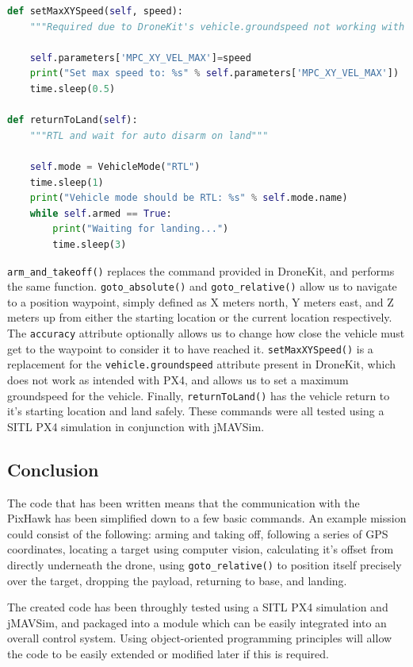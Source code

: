 \documentclass[11pt]{article}
\begin{document}
\begin{lstlisting}[language=Python]
def setMaxXYSpeed(self, speed):
    """Required due to DroneKit's vehicle.groundspeed not working with PX4"""

    self.parameters['MPC_XY_VEL_MAX']=speed
    print("Set max speed to: %s" % self.parameters['MPC_XY_VEL_MAX'])
    time.sleep(0.5)

def returnToLand(self):
    """RTL and wait for auto disarm on land"""

    self.mode = VehicleMode("RTL")
    time.sleep(1)
    print("Vehicle mode should be RTL: %s" % self.mode.name)
    while self.armed == True:
        print("Waiting for landing...")
        time.sleep(3)
\end{lstlisting}

\lstinline|arm_and_takeoff()| replaces the command provided in DroneKit, and performs the same function. \lstinline|goto_absolute()| and \lstinline|goto_relative()| allow us to navigate to a position waypoint, simply defined as X meters north, Y meters east, and Z meters up from either the starting location or the current location respectively. The \lstinline|accuracy| attribute optionally allows us to change how close the vehicle must get to the waypoint to consider it to have reached it. \lstinline|setMaxXYSpeed()| is a replacement for the \lstinline|vehicle.groundspeed| attribute present in DroneKit, which does not work as intended with PX4, and allows us to set a maximum groundspeed for the vehicle. Finally, \lstinline|returnToLand()| has the vehicle return to it's starting location and land safely. These commands were all tested using a SITL PX4 simulation in conjunction with jMAVSim.

\subsection{Conclusion}
The code that has been written means that the communication with the PixHawk has been simplified down to a few basic commands. An example mission could consist of the following: arming and taking off, following a series of GPS coordinates, locating a target using computer vision, calculating it's offset from directly underneath the drone, using \lstinline|goto_relative()| to position itself precisely over the target, dropping the payload, returning to base, and landing.

The created code has been throughly tested using a SITL PX4 simulation and jMAVSim, and packaged into a module which can be easily integrated into an overall control system. Using object-oriented programming principles will allow the code to be easily extended or modified later if this is required.
\end{document}

